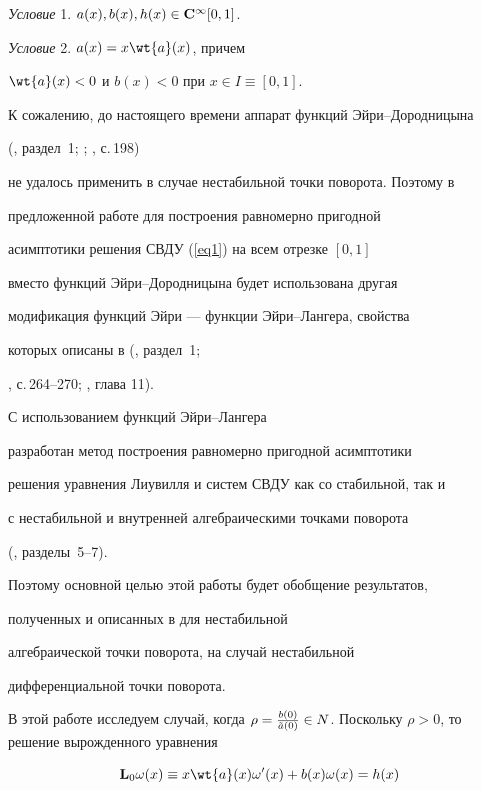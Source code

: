{\it Условие} 1. $a(x),b(x),h(x) \in \bold{C}^{\infty} [0,1]$.





{\it Условие} 2. $a(x) = x \wt{a} (x)$, причем


$\wt{a} (x) < 0$ и $b(x) < 0$ при $x \in I \equiv [0,1]$.





К сожалению, до настоящего времени аппарат функций Эйри--Дородницына 


(\cite{Bobochko3}, раздел~1; \cite{Dorodnicin}; \cite{Lomov}, с.\,198)


не удалось применить в случае нестабильной точки поворота. Поэтому в


предложенной работе для построения равномерно пригодной


асимптотики решения СВДУ (\ref{eq1}) на всем отрезке $[0,1]$


вместо функций Эйри--Дородницына будет использована другая


модификация функций Эйри --- функции Эйри--Лангера, свойства


которых описаны в (\cite{Bobochko3}, раздел~1;


\cite{Sprav}, с.\,264--270; \cite{Olver}, глава 11).


С использованием функций Эйри--Лангера


разработан метод построения равномерно пригодной асимптотики


решения уравнения Лиувилля и систем СВДУ как со стабильной, так и


с нестабильной и внутренней алгебраическими точками поворота


(\cite{Bobochko3}, разделы~5--7).


Поэтому основной целью этой работы будет обобщение результатов,


полученных и описанных в \cite{Bobochko3} для нестабильной


алгебраической точки поворота, на случай нестабильной


дифференциальной точки поворота.





В этой работе исследуем случай, когда $\rho = \frac{b(0)}{ \Tilde{a} (0)}


\in N$. Поскольку $\rho>0$, то решение вырожденного уравнения


\begin{equation}\label{eq2}


\bold{L}_0 \omega (x) \equiv x \wt{a} (x) \omega' (x) +


b(x) \omega (x) = h (x)


\end{equation}


